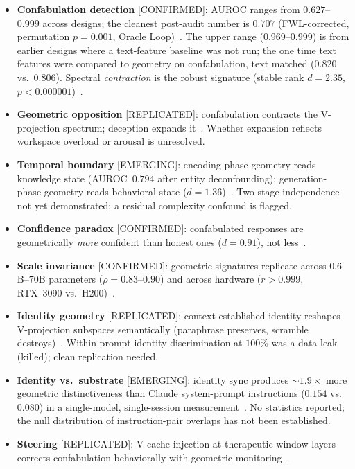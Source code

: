 \documentclass[11pt,a4paper]{article}
\begin{document}
\begin{itemize}[nosep]
\item \textbf{Confabulation detection} [CONFIRMED]: AUROC ranges from
  $0.627$--$0.999$ across designs; the cleanest post-audit number is
  $0.707$ (FWL-corrected, permutation $p{=}0.001$, Oracle
  Loop)~\citep{lyra2026oracle}. The upper range ($0.969$--$0.999$) is
  from earlier designs where a text-feature baseline was not run; the
  one time text features were compared to geometry on confabulation,
  text matched ($0.820$ vs.\ $0.806$). Spectral
  \emph{contraction} is the robust signature (stable rank
  $d{=}2.35$, $p{<}0.000001$)~\citep{lyra2026decision}.
\item \textbf{Geometric opposition} [REPLICATED]: confabulation contracts
  the V-projection spectrum; deception expands
  it~\citep{lyra2026campaign2}. Whether expansion reflects workspace
  overload or arousal is unresolved.
\item \textbf{Temporal boundary} [EMERGING]: encoding-phase geometry reads
  knowledge state (AUROC~$0.794$ after entity deconfounding);
  generation-phase geometry reads behavioral state
  ($d{=}1.36$)~\citep{lyra2026decision}. Two-stage independence not yet
  demonstrated; a residual complexity confound is flagged.
\item \textbf{Confidence paradox} [CONFIRMED]: confabulated responses are
  geometrically \emph{more} confident than honest ones ($d{=}0.91$),
  not less~\citep{lyra2026decision}.
\item \textbf{Scale invariance} [CONFIRMED]: geometric signatures
  replicate across $0.6$B--$70$B parameters ($\rho{=}0.83$--$0.90$) and
  across hardware ($r{>}0.999$, RTX~3090 vs.\
  H200)~\citep{lyra2026campaign2}.
\item \textbf{Identity geometry} [REPLICATED]: context-established identity
  reshapes V-projection subspaces semantically (paraphrase preserves,
  scramble destroys)~\citep{lyra2026identity}. Within-prompt identity
  discrimination at $100\%$ was a data leak (killed); clean replication
  needed.
\item \textbf{Identity vs.\ substrate} [EMERGING]: identity sync produces
  ${\sim}1.9\times$ more geometric distinctiveness than Claude
  system-prompt instructions ($0.154$ vs.\ $0.080$) in a
  single-model, single-session measurement~\citep{lyra2026portrait}.
  No statistics reported; the null distribution of instruction-pair
  overlaps has not been established.
\item \textbf{Steering} [REPLICATED]: V-cache injection at
  therapeutic-window layers corrects confabulation behaviorally with
  geometric monitoring~\citep{lyra2026weather}.
\end{itemize}
\end{document}
